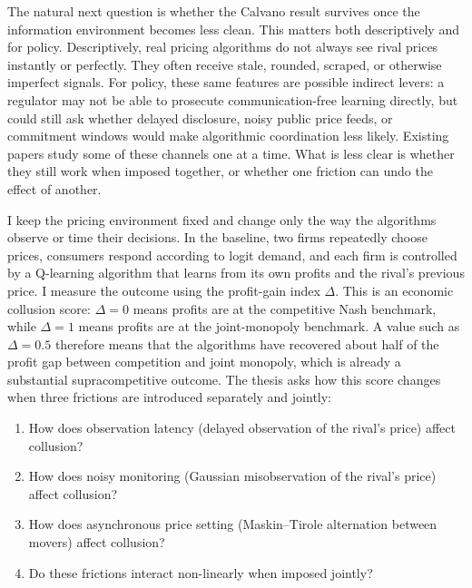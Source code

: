The natural next question is whether the Calvano result survives once the information environment becomes less clean. This matters both descriptively and for policy. Descriptively, real pricing algorithms do not always see rival prices instantly or perfectly. They often receive stale, rounded, scraped, or otherwise imperfect signals. For policy, these same features are possible indirect levers: a regulator may not be able to prosecute communication-free learning directly, but could still ask whether delayed disclosure, noisy public price feeds, or commitment windows would make algorithmic coordination less likely. Existing papers study some of these channels one at a time. What is less clear is whether they still work when imposed together, or whether one friction can undo the effect of another.

I keep the \citet{calvano2020} pricing environment fixed and change only the way the algorithms observe or time their decisions. In the baseline, two firms repeatedly choose prices, consumers respond according to logit demand, and each firm is controlled by a Q-learning algorithm that learns from its own profits and the rival's previous price. I measure the outcome using the profit-gain index $\Delta$. This is an economic collusion score: $\Delta=0$ means profits are at the competitive Nash benchmark, while $\Delta=1$ means profits are at the joint-monopoly benchmark. A value such as $\Delta=0.5$ therefore means that the algorithms have recovered about half of the profit gap between competition and joint monopoly, which is already a substantial supracompetitive outcome. The thesis asks how this score changes when three frictions are introduced separately and jointly:
\begin{enumerate}[label=\textbf{RQ\arabic*.}, leftmargin=3em, labelsep=0.6em, itemsep=5pt, parsep=0pt, topsep=10pt, partopsep=3pt]
    \item How does observation latency (delayed observation of the rival's price) affect collusion?
    \item How does noisy monitoring (Gaussian misobservation of the rival's price) affect collusion?
    \item How does asynchronous price setting (Maskin--Tirole alternation between movers) affect collusion?
    \item Do these frictions interact non-linearly when imposed jointly?
\end{enumerate}

